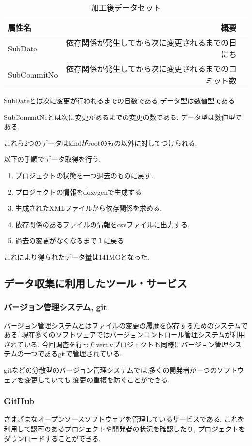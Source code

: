 \documentclass[submit,ses,noauthor]{ipsj} %
\begin{document}
\begin{table}[htb]
\caption{加工後データセット}
\begin{tabular}{|l|r|r|} \hline
属性名 & 概要 \\ \hline
SubDate & 依存関係が発生してから次に変更されるまでの日にち \\ \hline
SubCommitNo & 依存関係が発生してから次に変更されるまでのコミット数 \\ \hline
\end{tabular}
\label{tab:加工後データセット}
\end{table}

SubDateとは次に変更が行われるまでの日数である
データ型は数値型である.

SubCommitNoとは次に変更があるまでの変更の数である.
データ型は数値型である.

これら2つのデータはkindがrootのもの以外に対してつけられる.

以下の手順でデータ取得を行う.
\begin{enumerate}
\item プロジェクトの状態を一つ過去のものに戻す.
\item プロジェクトの情報をdoxygenで生成する
\item 生成されたXMLファイルから依存関係を求める.
\item 依存関係のあるファイルの情報をcsvファイルに出力する.
\item 過去の変更がなくなるまで１に戻る
\end{enumerate}
これにより得られたデータ量は141MGとなった.


\subsection{データ収集に利用したツール・サービス}
\subsubsection{バージョン管理システム, git}
バージョン管理システムとはファイルの変更の履歴を保存するためのシステムである.
現在多くのソフトウェアではバージョンコントロール管理システムが利用されている.
今回調査を行ったvert.vプロジェクトも同様にバージョン管理システムの一つであるgitで管理されている.

gitなどの分散型のバージョン管理システムでは,多くの開発者が一つのソフトウェアを変更していても,変更の重複を防ぐことができる.

\subsubsection{GitHub}
さまざまなオープンソースソフトウェアを管理しているサービスである.
これを利用して認可のあるプロジェクトや開発者の状況を確認したり, プロジェクトをダウンロードすることができる.
\end{document}
